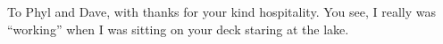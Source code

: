 
%
%
%

\thispagestyle{empty}
\vspace*{3.5cm}
\begin{flushright}

{\large To Phyl and Dave, with thanks for your kind hospitality.
  You see, I really was ``working'' when I was
  sitting on your deck staring at the lake.}

\end{flushright}



